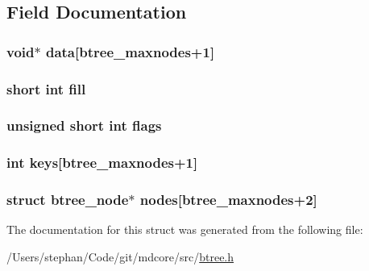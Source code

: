 \subsection{Field Documentation}
\hypertarget{structbtree__node_a3cfab63ed223a4bd84e8d785a0e3d9ef}{
\subsubsection[{data}]{\setlength{\rightskip}{0pt plus 5cm}void$\ast$ data\mbox{[}{\bf btree\-\_\-maxnodes}+1\mbox{]}}}\label{structbtree__node_a3cfab63ed223a4bd84e8d785a0e3d9ef}
\hypertarget{structbtree__node_a3848efec9b1ebaf57b640bab5471a270}{
\subsubsection[{fill}]{\setlength{\rightskip}{0pt plus 5cm}short int fill}}\label{structbtree__node_a3848efec9b1ebaf57b640bab5471a270}
\hypertarget{structbtree__node_ae718cba7f740adbac78a900ce25b73af}{
\subsubsection[{flags}]{\setlength{\rightskip}{0pt plus 5cm}unsigned short int flags}}\label{structbtree__node_ae718cba7f740adbac78a900ce25b73af}
\hypertarget{structbtree__node_acd615dd3caebe0bb636e606f308ad51b}{
\subsubsection[{keys}]{\setlength{\rightskip}{0pt plus 5cm}int keys\mbox{[}{\bf btree\-\_\-maxnodes}+1\mbox{]}}}\label{structbtree__node_acd615dd3caebe0bb636e606f308ad51b}
\hypertarget{structbtree__node_ae6d749deeab477d1ebbca6ed1033da3c}{
\subsubsection[{nodes}]{\setlength{\rightskip}{0pt plus 5cm}struct {\bf btree\-\_\-node}$\ast$ nodes\mbox{[}{\bf btree\-\_\-maxnodes}+2\mbox{]}}}\label{structbtree__node_ae6d749deeab477d1ebbca6ed1033da3c}


The documentation for this struct was generated from the following file\-:\begin{DoxyCompactItemize}
\item 
/\-Users/stephan/\-Code/git/mdcore/src/\hyperlink{btree_8h}{btree.\-h}\end{DoxyCompactItemize}
